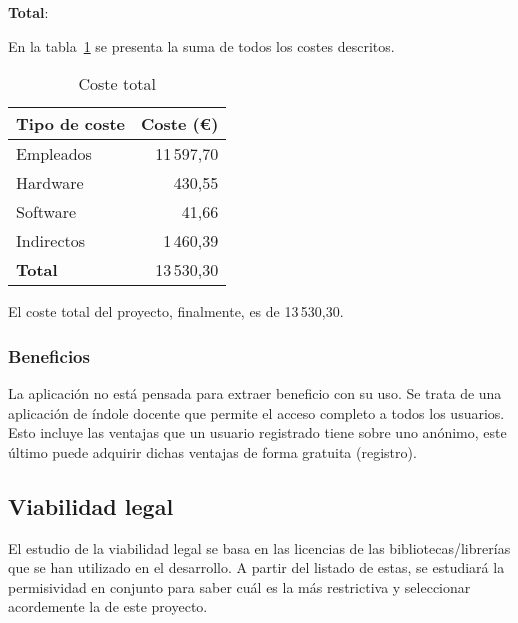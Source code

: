 \textbf{Total}:

En la tabla~\ref{tabla:total} se presenta la suma de todos los costes descritos.

\begin{table}[H]
    \centering
\begin{tabular}{lr}
\toprule
\textbf{Tipo de coste}     & \textbf{Coste (€)}     \\ \midrule
Empleados                  & 11\,597,70               \\
Hardware                   & 430,55                     \\
Software                   & 41,66                     \\
Indirectos                 & 1\,460,39                     \\ \midrule
\textbf{Total}             & 13\,530,30                     \\ \midrule
\end{tabular}
\caption{Coste total}
\label{tabla:total}
\end{table}

El coste total del proyecto, finalmente, es de 13\,530,30\texteuro.

\subsubsection{Beneficios}

La aplicación no está pensada para extraer beneficio con su uso. Se trata de una
aplicación de índole docente que permite el acceso completo a todos los
usuarios. Esto incluye las ventajas que un usuario registrado tiene sobre uno
anónimo, este último puede adquirir dichas ventajas de forma gratuita
(registro).

\clearpage
\subsection{Viabilidad legal}

El estudio de la viabilidad legal se basa en las licencias de las
bibliotecas/librerías que se han utilizado en el desarrollo. A partir del
listado de estas, se estudiará la permisividad en conjunto para saber cuál es la
más restrictiva y seleccionar acordemente la de este proyecto.

